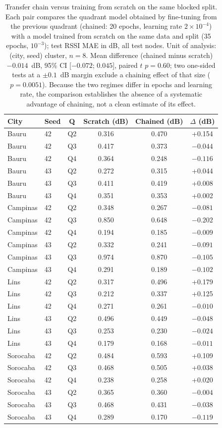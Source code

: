 \begin{table}[t]
\caption{Transfer chain versus training from scratch on the same blocked split. Each pair compares the quadrant model obtained by fine-tuning from the previous quadrant (chained: 20 epochs, learning rate $2\times10^{-4}$) with a model trained from scratch on the same data and split (35 epochs, $10^{-3}$); test RSSI MAE in dB, all test nodes. Unit of analysis: (city, seed) cluster, $n=8$. Mean difference (chained minus scratch) $-0.014$~dB, 95\% CI [$-0.072$; $0.045$], paired $t$ $p=0.60$; two one-sided tests at a $\pm0.1$~dB margin exclude a chaining effect of that size ($p=0.0051$). Because the two regimes differ in epochs and learning rate, the comparison establishes the absence of a systematic advantage of chaining, not a clean estimate of its effect.}
\label{tab:transfer_control}
\centering
\small
\setlength{\tabcolsep}{4pt}
\begin{tabular}{llcccc}
\toprule
City & Seed & Q & Scratch (dB) & Chained (dB) & $\Delta$ (dB) \\
\midrule
Bauru & 42 & Q2 & 0.316 & 0.470 & +0.154 \\
Bauru & 42 & Q3 & 0.417 & 0.373 & $-0.044$ \\
Bauru & 42 & Q4 & 0.364 & 0.248 & $-0.116$ \\
Bauru & 43 & Q2 & 0.272 & 0.315 & +0.044 \\
Bauru & 43 & Q3 & 0.411 & 0.419 & +0.008 \\
Bauru & 43 & Q4 & 0.351 & 0.353 & +0.002 \\
Campinas & 42 & Q2 & 0.348 & 0.267 & $-0.081$ \\
Campinas & 42 & Q3 & 0.850 & 0.648 & $-0.202$ \\
Campinas & 42 & Q4 & 0.194 & 0.185 & $-0.009$ \\
Campinas & 43 & Q2 & 0.332 & 0.241 & $-0.091$ \\
Campinas & 43 & Q3 & 0.974 & 0.870 & $-0.105$ \\
Campinas & 43 & Q4 & 0.291 & 0.189 & $-0.102$ \\
Lins & 42 & Q2 & 0.317 & 0.496 & +0.179 \\
Lins & 42 & Q3 & 0.212 & 0.337 & +0.125 \\
Lins & 42 & Q4 & 0.271 & 0.261 & $-0.010$ \\
Lins & 43 & Q2 & 0.496 & 0.449 & $-0.048$ \\
Lins & 43 & Q3 & 0.253 & 0.230 & $-0.024$ \\
Lins & 43 & Q4 & 0.179 & 0.168 & $-0.011$ \\
Sorocaba & 42 & Q2 & 0.484 & 0.593 & +0.109 \\
Sorocaba & 42 & Q3 & 0.468 & 0.505 & +0.038 \\
Sorocaba & 42 & Q4 & 0.238 & 0.258 & +0.020 \\
Sorocaba & 43 & Q2 & 0.365 & 0.360 & $-0.004$ \\
Sorocaba & 43 & Q3 & 0.468 & 0.431 & $-0.038$ \\
Sorocaba & 43 & Q4 & 0.289 & 0.170 & $-0.119$ \\
\bottomrule
\end{tabular}
\end{table}
